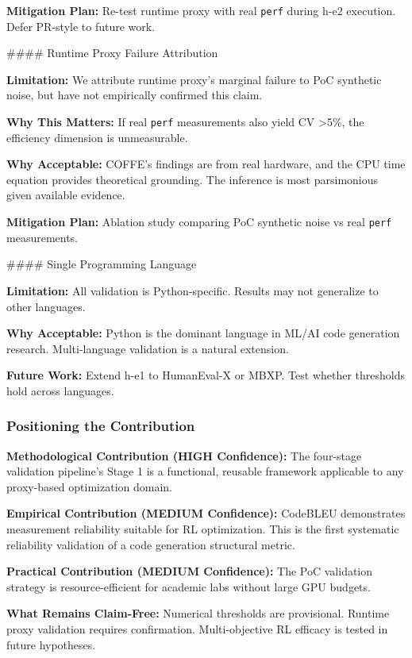 \textbf{Mitigation Plan:} Re-test runtime proxy with real \texttt{perf} during h-e2 execution. Defer PR-style to future work.

\#\#\#\# Runtime Proxy Failure Attribution

\textbf{Limitation:} We attribute runtime proxy's marginal failure to PoC synthetic noise, but have not empirically confirmed this claim.

\textbf{Why This Matters:} If real \texttt{perf} measurements also yield CV >5\%, the efficiency dimension is unmeasurable.

\textbf{Why Acceptable:} COFFE's findings are from real hardware, and the CPU time equation provides theoretical grounding. The inference is most parsimonious given available evidence.

\textbf{Mitigation Plan:} Ablation study comparing PoC synthetic noise vs real \texttt{perf} measurements.

\#\#\#\# Single Programming Language

\textbf{Limitation:} All validation is Python-specific. Results may not generalize to other languages.

\textbf{Why Acceptable:} Python is the dominant language in ML/AI code generation research. Multi-language validation is a natural extension.

\textbf{Future Work:} Extend h-e1 to HumanEval-X or MBXP. Test whether thresholds hold across languages.

\subsubsection{Positioning the Contribution}

\textbf{Methodological Contribution (HIGH Confidence):} The four-stage validation pipeline's Stage 1 is a functional, reusable framework applicable to any proxy-based optimization domain.

\textbf{Empirical Contribution (MEDIUM Confidence):} CodeBLEU demonstrates measurement reliability suitable for RL optimization. This is the first systematic reliability validation of a code generation structural metric.

\textbf{Practical Contribution (MEDIUM Confidence):} The PoC validation strategy is resource-efficient for academic labs without large GPU budgets.

\textbf{What Remains Claim-Free:} Numerical thresholds are provisional. Runtime proxy validation requires confirmation. Multi-objective RL efficacy is tested in future hypotheses.

